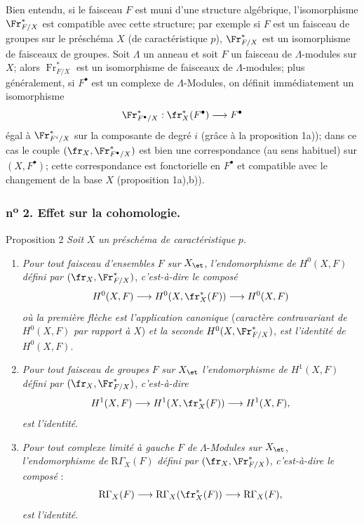 Bien entendu, si le faisceau $F$ est muni d'une structure algébrique, l'isomorphisme $\Fr^*_{F/X}$ est compatible avec cette structure; par exemple si $F$ est un faisceau de groupes sur le préschéma $X$ (de caractéristique $p$), $\Fr^*_{F/X}$ est un isomorphisme de faisceaux de groupes. Soit $\Lambda$ un anneau et soit $F$ un faisceau de $\Lambda$-modules sur $X$; alors $\operatorname{Fr}^*_{F/X}$ est un isomorphisme de faisceaux de $\Lambda$-modules; plus généralement, si $F^\bullet$ est un complexe de $\Lambda$-Modules, on définit immédiatement un isomorphisme
\[
\Fr^*_{F^\bullet/X}:\fr_X^*(F^\bullet)\longrightarrow F^\bullet
\]
égal à $\Fr^*_{F^i/X}$ sur la composante de degré $i$ (grâce à la proposition 1a)); dans ce cas le couple $(\fr_X,\Fr^*_{F^\bullet/X})$ est bien une correspondance (au sens habituel) sur $(X,F^\bullet)$; cette correspondance est fonctorielle en $F^\bullet$ et compatible avec le changement de la base $X$ (proposition 1a),b)).

\subsubsection*{n\textsuperscript{o} 2. Effet sur la cohomologie.}

\begin{statement}{Proposition 2}
\emph{Soit} $X$ \emph{un préschéma de caractéristique} $p$.
\begin{enumerate}[label=\alph*)]
\item \emph{Pour tout faisceau d'ensembles} $F$ \emph{sur} $X_{\et}$, \emph{l'endomorphisme de} $H^0(X,F)$ \emph{défini par} $(\fr_X,\Fr^*_{F/X})$, \emph{c'est-à-dire le composé}
\[
H^0(X,F)\longrightarrow H^0(X,\fr_X^*(F))\longrightarrow H^0(X,F)
\]
\emph{où la première flèche est l'application canonique} (\emph{caractère contravariant de} $H^0(X,F)$ \emph{par rapport à} $X$) \emph{et la seconde} $H^0(X,\Fr^*_{F/X})$, \emph{est l'identité de} $H^0(X,F)$.
\item
\emph{Pour tout faisceau de groupes} $F$ \emph{sur} $X_{\et}$ \emph{l'endomorphisme de} $H^1(X,F)$ \emph{défini par} $(\fr_X,\Fr^*_{F/X})$, \emph{c'est-à-dire}
\[
H^1(X,F)\longrightarrow H^1(X,\fr_X^*(F))\longrightarrow H^1(X,F),
\]
\emph{est l'identité}.
\item \emph{Pour tout complexe limité à gauche} $F$ \emph{de} $\Lambda$-\emph{Modules sur} $X_{\et}$, \emph{l'endomorphisme de} $\mathrm{R}\Gamma_X(F)$ \emph{défini par} $(\fr_X,\Fr^*_{F/X})$, \emph{c'est-à-dire le composé} :
\[
\mathrm{R}\Gamma_X(F)\longrightarrow \mathrm{R}\Gamma_X(\fr_X^*(F))\longrightarrow \mathrm{R}\Gamma_X(F),
\]
\emph{est l'identité}.
\end{enumerate}
\end{statement}

